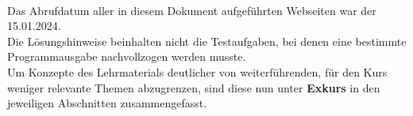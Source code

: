 \Hinweise

\paragraph*{}

Das Abrufdatum aller in diesem Dokument aufgeführten Webseiten war der 15.01.2024.\\

Die Lösungshinweise beinhalten nicht die Testaufgaben, bei denen eine bestimmte Programmausgabe nachvollzogen werden musste.\\

Um Konzepte des Lehrmaterials deutlicher von weiterführenden, für den Kurs weniger relevante Themen abzugrenzen, sind diese nun unter \textbf{Exkurs} in den jeweiligen Abschnitten zusammengefasst.